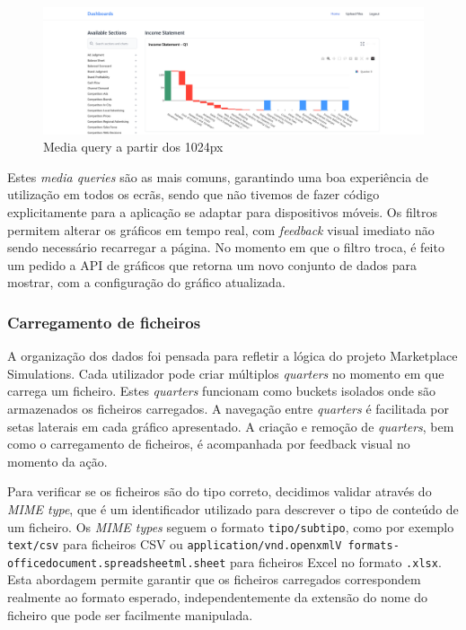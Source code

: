 \begin{figure}[H]
    \centering
    \includegraphics[max max width=\textwidth]{./img/res_1920}
 \caption{Media query a partir dos 1024px}
\end{figure}

Estes \textit{media queries} são as mais comuns, garantindo uma boa experiência de utilização em todos os ecrãs, sendo que não tivemos de fazer código explicitamente para a aplicação se adaptar para dispositivos móveis. Os filtros permitem alterar os gráficos em tempo real, com \textit{feedback} visual imediato não sendo necessário recarregar a página. No momento em que o filtro troca, é feito um pedido a API de gráficos que retorna um novo conjunto de dados para mostrar, com a configuração do gráfico atualizada.

\subsubsection{Carregamento de ficheiros}

A organização dos dados foi pensada para refletir a lógica do projeto Marketplace Simulations. Cada utilizador pode criar múltiplos \textit{quarters} no momento em que carrega um ficheiro. Estes \textit{quarters} funcionam como buckets isolados onde são armazenados os ficheiros carregados. A navegação entre \textit{quarters} é facilitada por setas laterais em cada gráfico apresentado. A criação e remoção de \textit{quarters}, bem como o carregamento de ficheiros, é acompanhada por feedback visual no momento da ação.

Para verificar se os ficheiros são do tipo correto, decidimos validar através do \textit{MIME type}, que é um identificador  utilizado para descrever o tipo de conteúdo de um ficheiro. Os \textit{MIME types} seguem o formato \texttt{tipo/subtipo}, como por exemplo \texttt{text/csv} para ficheiros CSV ou \texttt{application/\allowbreak vnd\allowbreak.open\allowbreak xmlV formats-\allowbreak officedocument.\allowbreak spreadsheetml.\allowbreak sheet} para ficheiros Excel no formato \texttt{.xlsx}. Esta abordagem permite garantir que os ficheiros carregados correspondem realmente ao formato esperado, independentemente da extensão do nome do ficheiro que pode ser facilmente manipulada. 

